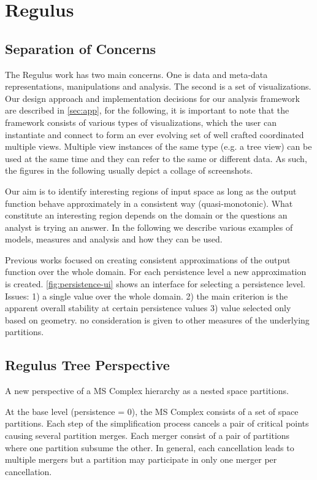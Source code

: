 \section{Regulus}
\label{sec:regulus}

\subsection{Separation of Concerns}
The Regulus work has two main concerns. One is data and meta-data representations, manipulations and analysis. The second is a set of visualizations. Our design approach and implementation decisions for our analysis framework are described in \autoref{sec:app}, for the following, it is important to note that the framework consists of various types of visualizations, which the user can instantiate and connect to form an ever evolving set of well crafted coordinated multiple views. Multiple view instances of the same type (e.g. a tree view) can be used at the same time and they can refer to the same or different data. As such, the figures in the following usually depict a collage of screenshots. 

Our aim is to identify interesting regions of input space as long as the output function behave approximately in a consistent way (quasi-monotonic). What constitute an interesting region depends on the domain or the questions an analyst is trying an answer. In the following we describe various examples of models, measures and analysis and how they can be used.

Previous works focused on creating consistent approximations of the output function over the whole domain. For each persistence level a new approximation is created. \autoref{fig:persistence-ui} shows an interface for selecting a persistence level. Issues: 1) a single value over the whole domain. 2) the main criterion is the apparent overall stability at certain persistence values 3) value selected only based on geometry. no consideration is given to other measures of the underlying partitions.

\subsection{Regulus Tree Perspective}
A new perspective of a MS Complex hierarchy as a nested space partitions. 

At the base level (persistence = 0), the MS Complex consists of a set of space partitions. Each step of the simplification process cancels a pair of critical points causing several partition merges. Each merger consist of a pair of partitions where one partition subsume the other. In general, each cancellation leads to multiple mergers but a partition may participate in only one merger per cancellation. 

